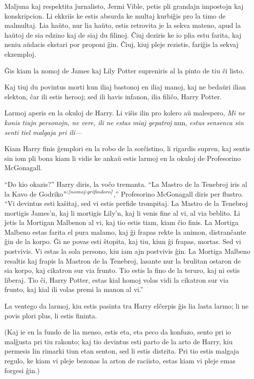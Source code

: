 Maljuna kaj respektita ĵurnalisto, Jermi Vible, petis pli grandajn
impostojn kaj konskripcion. Li ekkriis ke estis absurda ke multaj
kurbiĝis pro la timo de malmultaj. Lia haŭto, nur lia haŭto, estis
retrovita je la sekva mateno, apud la haŭtoj de sia edzino kaj de siaj
du filinoj. Ĉiuj deziris ke io plia estu farita, kaj neniu aŭdacis
ekstari por proponi ĝin. Ĉiuj, kiuj pleje rezistis, fariĝis la sekvaj
ekzemploj.

Ĝis kiam la nomoj de James kaj Lily Potter supreniris al la pinto de
tiu ĉi listo.

Kaj tiuj du povintus morti kun iliaj bastonoj en iliaj manoj, kaj ne
bedaŭri ilian elekton, ĉar ili estis herooj; sed ili havis infanon,
ilia filiĉo, Harry Potter.

Larmoj aperis en la okuloj de Harry. Li viŝis ilin pro kolero aŭ
malespero, \emph{Mi ne konis tiujn personojn, ne vere, ili ne estas
miaj gepatroj} nun, \emph{estus sensenca sin senti tiel malgaja pri
ili—}

Kiam Harry finis ĝemplori en la robo de la sorĉistino, li rigardis
supren, kaj sentis sin iom pli bona kiam li vidis ke ankaŭ estis
larmoj en la okuloj de Profesorino McGonagall.

``Do kio okazis?'' Harry diris, la voĉo tremanta.  ``La Mastro de la
Tenebroj iris al la Kavo de Godriko$^{\textit{n:\ref{nomoj:grifindoro}}}$,''
Profesorino McGonagall diris per flustro. ``Vi devintus esti kaŝitaj,
sed vi estis perfide trompitaj. La Mastro de la Tenebroj mortigis
James'n, kaj li mortigis Lily'n, kaj li venis fine al vi, al via
beblito. Li ĵetis la Mortigan Malbenon al vi, kaj tio estis tiam, kiam
ĉio finis. La Mortiga Malbeno estas farita el pura malamo, kaj ĝi
frapas rekte la animon, distranĉante ĝin de la korpo. Ĝi ne povas esti
ŝtopita, kaj tiu, kiun ĝi frapas, mortas. Sed vi postvivis. Vi estas
la sola persono, kiu iam ajn postvivis ĝin. La Mortiga Malbeno
resaltis kaj frapis la Mastron de la Tenebroj, lasante nur la brulitan
ostaron de sia korpo, kaj cikatron sur via frunto. Tio estis la fino
de la teruro, kaj ni estis liberaj. Tio ĉi, Harry Potter, estas kial homoj
volas vidi la cikatron sur via frunto, kaj kial ili volas premi la
manon al vi.''

La ventego da larmoj, kiu estis pasinta tra Harry elĉerpis ĝis lia
lasta larmo; li ne povis plori plus, li estis fininta.

(Kaj ie en la fundo de lia menso, estis eta, eta peco da konfuzo,
sento pri io malĝusta pri tiu rakonto; kaj tio devintus esti parto de
la arto de Harry, kiu permesis lin rimarki tiun etan senton, sed li
estis distrita. Pri tio estis malgaja regulo, ke kiam vi pleje bezonas
la arton de raciisto, estas kiam vi pleje emas forgesi ĝin.)

